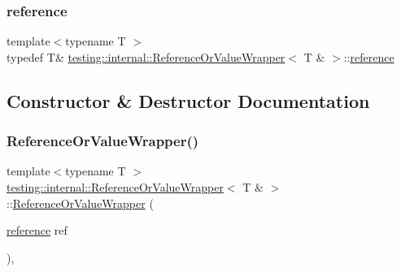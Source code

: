 \subsubsection{\texorpdfstring{reference}{reference}}
{\footnotesize\ttfamily template$<$typename T $>$ \\
typedef T\& \hyperlink{classtesting_1_1internal_1_1_reference_or_value_wrapper}{testing\+::internal\+::\+Reference\+Or\+Value\+Wrapper}$<$ T \& $>$\+::\hyperlink{classtesting_1_1internal_1_1_reference_or_value_wrapper_3_01_t_01_6_01_4_a62e7f6ebcf40daa08130ea52fd0215ee}{reference}}



\subsection{Constructor \& Destructor Documentation}
\mbox{\label{classtesting_1_1internal_1_1_reference_or_value_wrapper_3_01_t_01_6_01_4_ad31b242ceae7f318096c78a798b33379}} 
\subsubsection{\texorpdfstring{Reference\+Or\+Value\+Wrapper()}{ReferenceOrValueWrapper()}}
{\footnotesize\ttfamily template$<$typename T $>$ \\
\hyperlink{classtesting_1_1internal_1_1_reference_or_value_wrapper}{testing\+::internal\+::\+Reference\+Or\+Value\+Wrapper}$<$ T \& $>$\+::\hyperlink{classtesting_1_1internal_1_1_reference_or_value_wrapper}{Reference\+Or\+Value\+Wrapper} (\begin{DoxyParamCaption}\item[{\hyperlink{classtesting_1_1internal_1_1_reference_or_value_wrapper_3_01_t_01_6_01_4_a62e7f6ebcf40daa08130ea52fd0215ee}{reference}}]{ref }\end{DoxyParamCaption})\hspace{0.3cm}{\ttfamily [inline]}, {\ttfamily [explicit]}}



